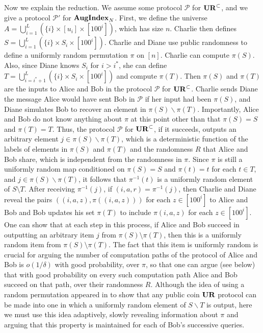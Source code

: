 Now we explain the reduction. We assume some protocol $\mathcal P$ for $\mathbf{UR}^\subset$, and we give a protocol $\mathcal P'$ for $\mathbf{AugIndex}_N$. First, we define the universe $A = \bigcup_{i=1}^L (\{i\} \times [u_i]\times [100^i])$, which has size $n$. Charlie then defines $S = \bigcup_{i=1}^L (\{i\} \times S_i \times [100^i])$. Charlie and
Diane use public randomness to define a uniformly random permutation $\pi$ on $[n]$. Charlie can compute
$\pi(S)$. Also, since Diane knows $S_i$ for $i > i^*$, she can define $T =  \bigcup_{i=i^*+1}^L (\{i\} \times S_i \times [100^i])$
and compute $\pi(T)$. Then $\pi(S)$ and $\pi(T)$ are the inputs to Alice and Bob in the protocol $\mathcal P$
for $\mathbf{UR}^\subset$. Charlie sends Diane the message Alice would have sent Bob in $\mathcal P$ if her input had been $\pi(S)$, and Diane simulates Bob to recover an element in $\pi(S)\backslash \pi(T)$.
Importantly, Alice and Bob do not know anything about $\pi$ at this point other than that $\pi(S) = S$ and $\pi(T) = T$. Thus,
the protocol $\mathcal P$ for $\mathbf{UR}^\subset$, if it succeeds, outputs an arbitrary element $j \in \pi(S) \backslash \pi(T)$, which is a 
deterministic function of the labels of elements in $\pi(S)$ and $\pi(T)$ and the randomness $R$ that Alice and Bob share, which is independent from the randomness in $\pi$. Since $\pi$ is still a uniformly random map conditioned on $\pi(S) = S$
and $\pi(t) = t$ for each $t \in T$, and $j \in \pi(S) \backslash \pi(T)$, it follows that $\pi^{-1}(t)$ is a uniformly random element
of $S \setminus T$. After receiving $\pi^{-1}(j)$, if $(i, a, r) = \pi^{-1}(j)$, then
Charlie and Diane reveal the pairs $((i, a, z), \pi((i,a,z)))$ for each $z \in [100^i]$ to Alice and Bob and Bob updates
his set $\pi(T)$ to include $\pi(i,a,z)$ for each $z \in [100^i]$. One can show that at each step in this process, if Alice and Bob
succeed in outputting an arbitrary item $j$ from $\pi(S) \setminus \pi(T)$, then this is a uniformly random item from
$\pi(S) \setminus \pi(T)$. The fact that this item is uniformly random is crucial for arguing the number of computation paths
of the protocol of Alice and Bob is $o(1/\delta)$ with good probability, over $\pi$, so that one can argue (see below) that with good probability on
every such computation path Alice and Bob succeed on that path, over their randomness $R$. Although the idea of using a random permutation appeared in \cite{JowhariST11} to show that any public coin $\mathbf{UR}$ protocol can be made
into one in which a uniformly random element of $S \backslash T$ is output, here we must use this idea adaptively, slowly revealing
information about $\pi$ and arguing that this property is maintained for each of Bob's successive queries.  

